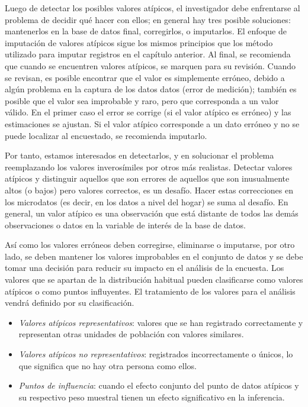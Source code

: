 \documentclass[
  12pt,
  spanish,
]{book}
\providecommand{\tightlist}{%
  \setlength{\itemsep}{0pt}\setlength{\parskip}{0pt}}
\begin{document}
Luego de detectar los posibles valores atípicos, el investigador debe enfrentarse al problema de decidir qué hacer con ellos; en general hay tres posible soluciones: mantenerlos en la base de datos final, corregirlos, o imputarlos. El enfoque de imputación de valores atípicos sigue los mismos principios que los método utilizado para imputar registros en el capítulo anterior. Al final, se recomienda que cuando se encuentren valores atípicos, se marquen para su revisión. Cuando se revisan, es posible encontrar que el valor es simplemente erróneo, debido a algún problema en la captura de los datos datos (error de medición); también es posible que el valor sea improbable y raro, pero que corresponda a un valor válido. En el primer caso el error se corrige (si el valor atípico es erróneo) y las estimaciones se ajustan. Si el valor atípico corresponde a un dato erróneo y no se puede localizar al encuestado, se recomienda imputarlo.

Por tanto, estamos interesados en detectarlos, y
en solucionar el problema reemplazando los valores inverosímiles por otros más realistas.
Detectar valores atípicos y distinguir aquellos que son errores de aquellos que
son inusualmente altos (o bajos) pero valores correctos, es un desafío. Hacer estas
correcciones en los microdatos (es decir, en los datos a nivel del hogar) se suma al desafío. En general, un valor atípico es una observación que está distante de todos las demás observaciones o datos en la variable de interés de la base de datos.

Así como los valores erróneos deben corregirse, eliminarse o imputarse, por otro lado, se deben mantener los valores improbables en el conjunto de datos y se debe tomar una decisión para reducir su impacto en el análisis de la encuesta. Los valores que se apartan de la distribución habitual pueden clasificarse como valores atípicos o como puntos influyentes. El tratamiento de los valores para el análisis vendrá definido por su clasificación.

\begin{itemize}
\tightlist
\item
  \emph{Valores atípicos representativos}: valores que se han registrado correctamente y representan otras unidades de población con valores similares.
\item
  \emph{Valores atípicos no representativos}: registrados incorrectamente o únicos, lo que significa que no hay otra persona como ellos.
\item
  \emph{Puntos de influencia}: cuando el efecto conjunto del punto de datos atípicos y su respectivo peso muestral tienen un efecto significativo en la inferencia.
\end{itemize}
\end{document}
